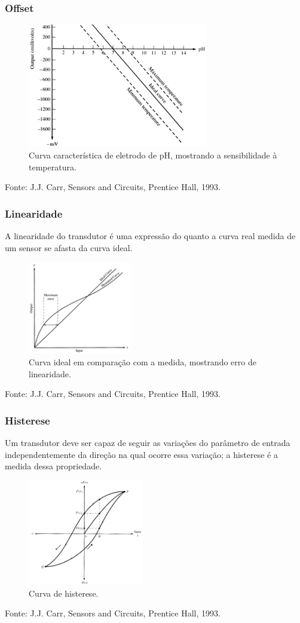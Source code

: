 \documentclass[t]{beamer}
\begin{document}
\begin{frame}
	\frametitle{Offset}
	\begin{figure}
		\includegraphics[width=0.7\textwidth]{offset}
		\caption{Curva característica de eletrodo de pH, mostrando a sensibilidade à temperatura.}
	\end{figure}  	
	{\scriptsize Fonte: J.J. Carr, Sensors and Circuits, Prentice Hall, 1993.}
\end{frame}

\begin{frame}
	\frametitle{Linearidade}
	A linearidade do transdutor é uma expressão do quanto a curva real medida de um sensor se afasta da curva ideal. 
	\begin{figure}
		\includegraphics[width=0.4\textwidth]{linearidade}
		\caption{Curva ideal em comparação com a medida, mostrando erro de linearidade.}
	\end{figure} 
	{\scriptsize Fonte: J.J. Carr, Sensors and Circuits, Prentice Hall, 1993.}
\end{frame}


\begin{frame}
	\frametitle{Histerese}
	Um transdutor deve ser capaz de seguir as variações do parâmetro de entrada independentemente da direção na qual ocorre essa variação; a histerese é a medida dessa propriedade. 	
	\begin{figure}
		\includegraphics[width=0.45\textwidth]{histerese}
		\caption{Curva de histerese.}
	\end{figure} 
	{\scriptsize Fonte: J.J. Carr, Sensors and Circuits, Prentice Hall, 1993.}
\end{frame}
\end{document}
